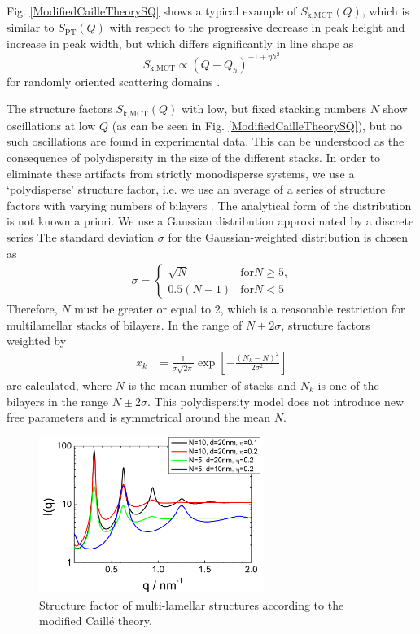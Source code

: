 Fig. \ref{ModifiedCailleTheorySQ} shows a typical example of
$S_\text{k,MCT}(Q)$, which is similar to $S_\text{PT}(Q)$ with
respect to the progressive decrease in peak height and increase in
peak width, but which differs significantly in line shape as
$$
S_\text{k,MCT} \propto (Q-Q_h)^{-1+\eta h^2}
$$
for randomly oriented scattering domains \cite{Roux1988,Zhang1994}.


The structure factors $S_\text{k,MCT}(Q)$ with low, but fixed
stacking numbers $N$ show oscillations at low $Q$ (as can be seen in
Fig. \ref{ModifiedCailleTheorySQ}), but no such oscillations are
found in experimental data. This can be understood as the
consequence of polydispersity in the size of the different stacks.
In order to eliminate these artifacts from strictly monodisperse
systems, we use a `polydisperse' structure factor, i.e. we use an
average of a series of structure factors with varying numbers of
bilayers \cite{Fruhwirth2004}. The analytical form of the
distribution is not known a priori. We use a Gaussian distribution
approximated by a discrete series The standard deviation $\sigma$
for the Gaussian-weighted distribution is chosen as
\begin{align}
\sigma =
\begin{cases}
\sqrt{N} & \text{for} N\geq 5 \text{,} \\
0.5(N-1) & \text{for} N< 5
\end{cases}
\end{align}
Therefore, $N$ must be greater or equal to 2, which is a
reasonable restriction for multilamellar stacks of bilayers. In
the range of $N \pm 2\sigma$, structure factors weighted by
\begin{align}
x_k & = \frac{1}{\sigma\sqrt{2\pi}} \exp\left[
-\frac{(N_k-N)^2}{2\sigma^2}\right]
\end{align}
are calculated, where $N$ is the mean number of stacks and $N_k$
is one of the  bilayers in the range $N\pm 2\sigma$. This
polydispersity model does not introduce new free parameters and is
symmetrical around the mean $N$.

\begin{figure}[htb]
\begin{center}
\includegraphics[width=0.65\textwidth,height=0.5\textwidth]{../images/structure_factor/Lamellar/MCLamellar.png}
\end{center}
\caption{Structure factor of multi-lamellar structures according to the modified Caill\'e theory.}
\label{fig:MCLamellar}
\end{figure}

